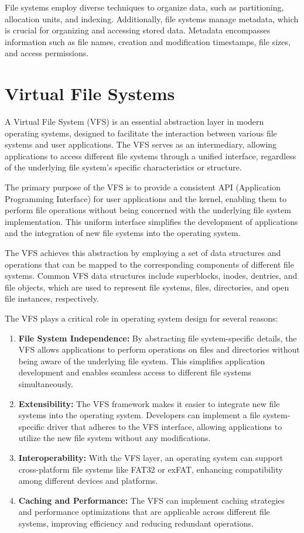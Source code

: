 File systems employ diverse techniques to organize data, such as partitioning, allocation units, and indexing.
Additionally, file systems manage metadata, which is crucial for organizing and accessing stored data.
Metadata encompasses information such as file names, creation and modification timestamps, file sizes, and access permissions.

\section{Virtual File Systems}\label{sec:virtual-file-systems}

A Virtual File System (VFS) is an essential abstraction layer in modern operating systems, designed to facilitate the interaction between various file systems and user applications.
The VFS serves as an intermediary, allowing applications to access different file systems through a unified interface, regardless of the underlying file system's specific characteristics or structure.

The primary purpose of the VFS is to provide a consistent API (Application Programming Interface) for user applications and the kernel, enabling them to perform file operations without being concerned with the underlying file system implementation.
This uniform interface simplifies the development of applications and the integration of new file systems into the operating system.

The VFS achieves this abstraction by employing a set of data structures and operations that can be mapped to the corresponding components of different file systems.
Common VFS data structures include superblocks, inodes, dentries, and file objects, which are used to represent file systems, files, directories, and open file instances, respectively.

The VFS plays a critical role in operating system design for several reasons:

\begin{enumerate}
    \item \textbf{File System Independence:} By abstracting file system-specific details, the VFS allows applications to perform operations on files and directories without being aware of the underlying file system.
    This simplifies application development and enables seamless access to different file systems simultaneously.
    \item \textbf{Extensibility:} The VFS framework makes it easier to integrate new file systems into the operating system.
    Developers can implement a file system-specific driver that adheres to the VFS interface, allowing applications to utilize the new file system without any modifications.
    \item \textbf{Interoperability:} With the VFS layer, an operating system can support cross-platform file systems like FAT32 or exFAT, enhancing compatibility among different devices and platforms.
    \item \textbf{Caching and Performance:} The VFS can implement caching strategies and performance optimizations that are applicable across different file systems, improving efficiency and reducing redundant operations.
\end{enumerate}

